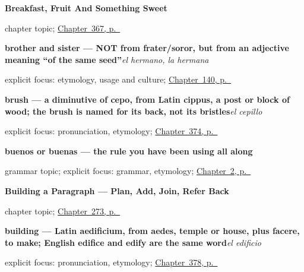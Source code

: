 \noindent\begin{minipage}[t]{\linewidth}
\raggedright
\textbf{Breakfast, Fruit And Something Sweet}\par
\footnotesize chapter topic; \hyperref[ch:el-desayuno-y-la-fruta]{Chapter~367, p.~\pageref*{ch:el-desayuno-y-la-fruta}}
\end{minipage}\par\smallskip

\noindent\begin{minipage}[t]{\linewidth}
\raggedright
\textbf{brother and sister — NOT from frater/soror, but from an adjective meaning \textquotedblleft{}of the same seed\textquotedblright{}}\enspace\emph{el hermano, la hermana}\par
\footnotesize explicit focus: etymology, usage and culture; \hyperref[ch:spanish-family]{Chapter~140, p.~\pageref*{ch:spanish-family}}
\end{minipage}\par\smallskip

\noindent\begin{minipage}[t]{\linewidth}
\raggedright
\textbf{brush — a diminutive of cepo, from Latin cippus, a post or block of wood; the brush is named for its back, not its bristles}\enspace\emph{el cepillo}\par
\footnotesize explicit focus: pronunciation, etymology; \hyperref[ch:el-lapiz-y-el-cepillo]{Chapter~374, p.~\pageref*{ch:el-lapiz-y-el-cepillo}}
\end{minipage}\par\smallskip

\noindent\begin{minipage}[t]{\linewidth}
\raggedright
\textbf{buenos or buenas — the rule you have been using all along}\par
\footnotesize grammar topic; explicit focus: grammar, etymology; \hyperref[ch:greetings]{Chapter~2, p.~\pageref*{ch:greetings}}
\end{minipage}\par\smallskip

\noindent\begin{minipage}[t]{\linewidth}
\raggedright
\textbf{Building a Paragraph --- Plan, Add, Join, Refer Back}\par
\footnotesize chapter topic; \hyperref[ch:parrafo]{Chapter~273, p.~\pageref*{ch:parrafo}}
\end{minipage}\par\smallskip

\noindent\begin{minipage}[t]{\linewidth}
\raggedright
\textbf{building — Latin aedificium, from aedes, temple or house, plus facere, to make; English edifice and edify are the same word}\enspace\emph{el edificio}\par
\footnotesize explicit focus: pronunciation, etymology; \hyperref[ch:la-selva-y-el-prado]{Chapter~378, p.~\pageref*{ch:la-selva-y-el-prado}}
\end{minipage}\par\smallskip

